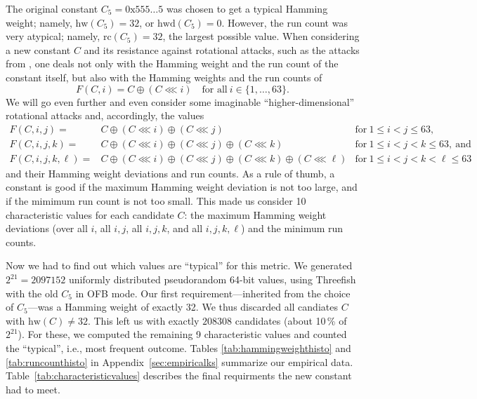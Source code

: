 \documentclass[11pt,twoside]{article}
\newcommand{\rol}{\mathbin{\lll}}
\begin{document}
The original constant $C_5=\text{0x555\ldots5}$ was chosen to get a typical
Hamming weight; namely, $\mbox{hw}(C_5)=32$, or $\mbox{hwd}(C_5)=0$. However, the run
count was very atypical; namely, $\mbox{rc}(C_5)=32$, the largest possible value. 
When considering a new constant $C$ and 
its resistance against rotational attacks, such as the attacks from 
\cite{KN10,RKN10}, one deals not only with the Hamming weight
and the run count of the constant itself, but also with the Hamming weights 
and the run counts of 
  \[ F(C,i) = C \oplus (C \rol i) \quad 
    \mbox{for all}\  i \in \{1, \ldots, 63\}.
  \]  
We will go even further and even 
consider some imaginable ``higher-dimensional'' rotational attacks and,
accordingly, the values 
\begin{eqnarray*}
   F(C,i,j) = & C \oplus (C \rol i) \oplus (C \rol j) &
    \mbox{for}\ 1 \le i < j \le 63,
   \\  
   F(C,i,j,k) = & C \oplus (C \rol i) \oplus (C \rol j) \oplus (C \rol k) &
    \mbox{for}\ 1 \le i < j < k \le 63, \ \mbox{and}
  \\
    F(C,i,j,k,\ell) = & C \oplus (C \rol i) \oplus (C \rol j) 
                      \oplus (C \rol k) \oplus (C \rol \ell) &
    \mbox{for}\ 1 \le i < j < k <  \ell \le 63
\end{eqnarray*}
and their Hamming weight deviations and run
counts. As a rule of thumb, a constant is good if the maximum Hamming weight
deviation is not too large, and if the mimimum run count is not too
small. This made us consider 10 characteristic values for each candidate $C$:
the maximum Hamming weight deviations (over all $i$, all $i,j$, all $i,j,k$,
and all $i,j,k,\ell$) and the minimum run counts. 

Now we had to find out which values are ``typical'' for this metric. We 
generated 
$2^{21}=2097152$ uniformly distributed pseudorandom 64-bit values, using Threefish
with the old $C_5$ in OFB mode. 
Our first requirement---inherited from the choice of $C_5$---was a Hamming
weight of exactly 32. 
We thus discarded all candiates $C$ with $\mbox{hw}(C) \neq 32$. This left 
us with exactly $208308$ candidates (about 10\,\% of $2^{21}$). For these, 
we computed the remaining 9 characteristic values and counted the ``typical'',
i.e., most frequent outcome. 
Tables \ref{tab:hammingweighthisto} and \ref{tab:runcounthisto} in 
Appendix~\ref{sec:empiricalks} summarize our empirical data. 
Table~\ref{tab:characteristicvalues} describes the final requirments the new
constant had to meet. 
\end{document}
